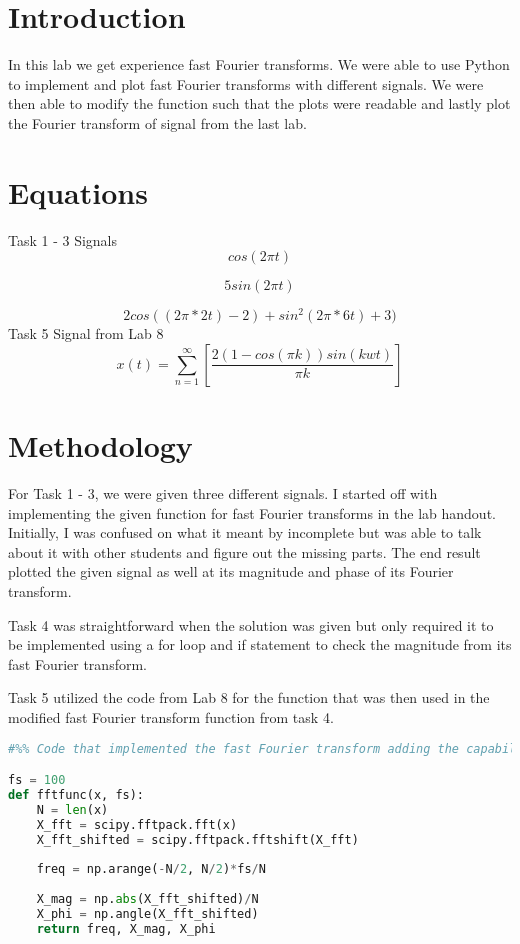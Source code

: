 \documentclass[12pt]{report}
\begin{document}
\section{Introduction}
 

In this lab we get experience fast Fourier transforms. We were able to use Python to implement and plot fast Fourier transforms with different signals. We were then able to modify the function such that the plots were readable and lastly plot the Fourier transform of signal from the last lab. 

\section{Equations}
Task 1 - 3 Signals
\begin{equation*}
cos(2\pi t)
\end{equation*}

\begin{equation*}
5sin(2\pi t)
\end{equation*}

\begin{equation*}
2cos((2\pi * 2t) - 2) + sin^2(2\pi * 6t) + 3) 
\end{equation*}
Task 5 Signal from Lab 8 
\begin{equation*}
x(t) = \sum_{n=1}^{\infty} [\frac{2(1-cos(\pi k))sin(kwt)}{\pi k}]
\end{equation*}


\section{Methodology}

For Task 1 - 3, we were given three different signals. I started off with implementing the given function for fast Fourier transforms in the lab handout. Initially, I was confused on what it meant by incomplete but was able to talk about it with other students and figure out the missing parts. The end result plotted the given signal as well at its magnitude and phase of its Fourier transform. 

Task 4 was straightforward when the solution was given but only required it to be implemented using a for loop and if statement to check the magnitude from its fast Fourier transform. 

Task 5 utilized the code from Lab 8 for the function that was then used in the modified fast Fourier transform function from task 4. 

\begin{lstlisting}[language=Python]
#%% Code that implemented the fast Fourier transform adding the capability to return the frequency, magnitude, and phase. Sampling frequency fs = 100 is defined separately outside of the function. 

fs = 100
def fftfunc(x, fs):
    N = len(x)
    X_fft = scipy.fftpack.fft(x)
    X_fft_shifted = scipy.fftpack.fftshift(X_fft)
    
    freq = np.arange(-N/2, N/2)*fs/N
    
    X_mag = np.abs(X_fft_shifted)/N
    X_phi = np.angle(X_fft_shifted)
    return freq, X_mag, X_phi

\end{lstlisting}
\end{document}
